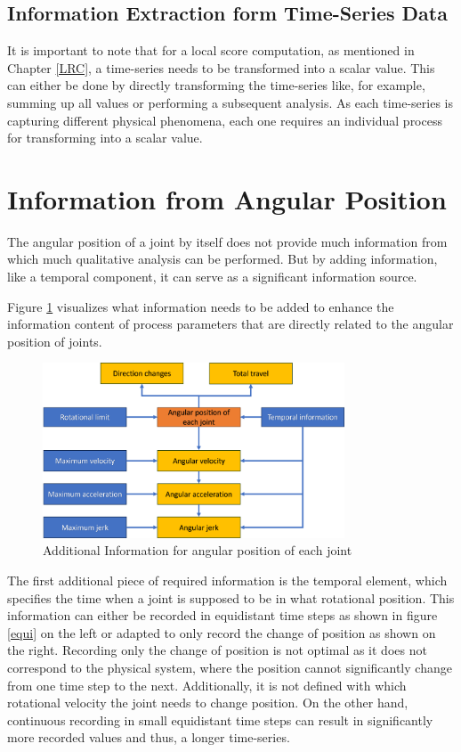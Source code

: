  
\subsection{Information Extraction form Time-Series Data}\label{extraction}
It is important to note that for a local score computation, as mentioned in Chapter \ref{LRC}, a time-series needs to be transformed into a scalar value. This can either be done by directly transforming the time-series like, for example, summing up all values or performing a subsequent analysis. As each time-series is capturing different physical phenomena, each one requires an individual process for transforming into a scalar value.
\newpage




\section{Information from Angular Position}
The angular position of a joint by itself does not provide much information from which much qualitative analysis can be performed. But by adding information, like a temporal component, it can serve as a significant information source. 

Figure \ref{agularstuff} visualizes what information needs to be added to enhance the information content of process parameters that are directly related to the angular position of joints.

\begin{figure}[H]
	\centerline{\includegraphics[width=0.8\textwidth]{figures/angularstuff.png}}
	\caption{Additional Information for angular position of each joint}
	\label{agularstuff}
\end{figure}



The first additional piece of required information is the temporal element, which specifies the time when a joint is supposed to be in what rotational position. This information can either be recorded in equidistant time steps as shown in figure \ref{equi} on the left or adapted to only record the change of position as shown on the right. Recording only the change of position is not optimal as it does not correspond to the physical system, where the position cannot significantly change from one time step to the next. Additionally, it is not defined with which rotational velocity the joint needs to change position. On the other hand, continuous recording in small equidistant time steps can result in significantly more recorded values and thus, a longer time-series.

